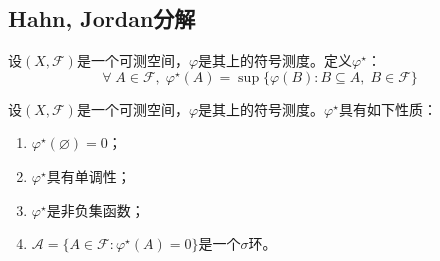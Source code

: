 \subsection{Hahn, Jordan分解}
\begin{definition}
	 设$(X,\mathscr{F})$是一个可测空间，$\varphi$是其上的符号测度。定义$\varphi^{\star}$：
	\begin{equation*}
		\forall\;A\in\mathscr{F},\;\varphi^{\star}(A)=\sup\{\varphi(B):B\subseteq A,\;B\in\mathscr{F}\}
	\end{equation*}
\end{definition}
\begin{property}\label{prop:varphiStar}
	设$(X,\mathscr{F})$是一个可测空间，$\varphi$是其上的符号测度。$\varphi^{\star}$具有如下性质：
	\begin{enumerate}
		\item $\varphi^{\star}(\varnothing)=0$；
		\item $\varphi^{\star}$具有单调性；
		\item $\varphi^{\star}$是非负集函数；
		\item $\mathscr{A}=\{A\in\mathscr{F}:\varphi^{\star}(A)=0\}$是一个$\sigma$环。
	\end{enumerate}
\end{property}
